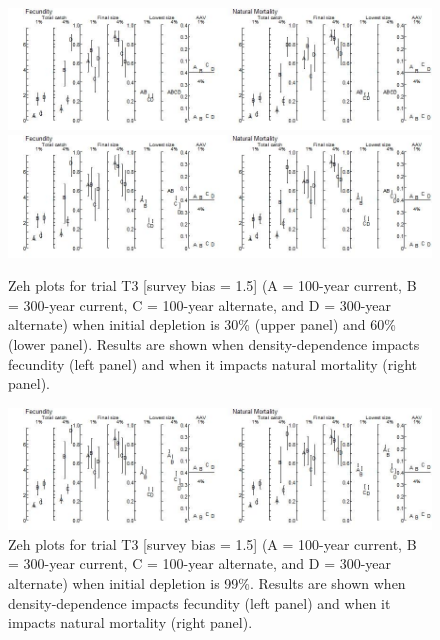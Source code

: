 \documentclass{article}\usepackage[]{graphicx}\usepackage[]{color}
\providecommand\phantomsection{}
\renewcommand{\thefigure}{\thesection(\alph{figure})}
\begin{document}
\begin{landscape}
\phantomsection
\renewcommand{\thefigure}{\thesection(\alph{figure})}
\setcounter{figure}{0}


\begin{figure}[H]
\centering
\includegraphics[]{SC66aRMP10_Part2_T3-R.jpeg}
\includegraphics[]{SC66aRMP10_Part2_T3-S.jpeg}
\caption{
Zeh plots for trial T3
[survey bias = 1.5]
(A = 100-year current, B = 300-year current, C = 100-year alternate, and D = 300-year alternate)
when initial depletion is 30\% (upper panel) and 60\% (lower panel).
Results are shown when density-dependence impacts fecundity (left panel) and when it impacts natural mortality (right panel).
}
\end{figure}



\begin{figure}[H]
\centering
\includegraphics[]{SC66aRMP10_Part2_T3-D.jpeg}
\caption{
Zeh plots for trial T3
[survey bias = 1.5]
(A = 100-year current, B = 300-year current, C = 100-year alternate, and D = 300-year alternate)
when initial depletion is 99\%.
Results are shown when density-dependence impacts fecundity (left panel) and when it impacts natural mortality (right panel).
}
\end{figure}


\end{landscape}
\end{document}
